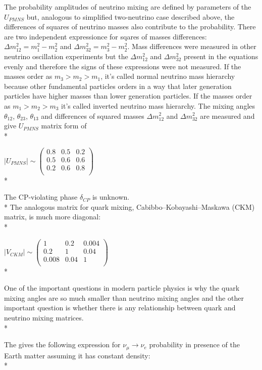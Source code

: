 The probability amplitudes of neutrino mixing are defined by parameters of the $U_{PMNS}$ but, analogous to simplified two-neutrino case described above, the differences of squares of neutrino masses also contribute to the probability. There are two independent expressionce for sqares of masses differences: ${\Delta}m_{12}^2 = m_1^2-m_2^2$ and ${\Delta}m_{32}^2 = m_3^2-m_2^2$. Mass differences were measured in other neutrino oscillation experiments but the ${\Delta}m_{12}^2$ and ${\Delta}m_{32}^2$ present in the equations evenly and therefore the signs of these expressions were not measured. If the masses order as $m_3 > m_2 > m_1$, it's called normal neutrino mass hierarchy because other fundamental particles orders in a way that later generation particles have higher masses than lower generation particles. If the masses order as $m_1 > m_2 > m_3$ it's called inverted neutrino mass hierarchy. The mixing angles $\theta_{12}$, $\theta_{23}$, $\theta_{13}$ and differences of squared masses ${\Delta}m_{12}^2$ and ${\Delta}m_{32}^2$ are measured and give $U_{PMNS}$ matrix form of\\*

$|U_{PMNS}| \sim
 \begin{pmatrix}
  0.8 & 0.5 & 0.2 \\ 0.5 & 0.6 & 0.6 \\ 0.2 & 0.6 & 0.8 \\
 \end{pmatrix}$\\*

The CP-violating phase $\delta_{CP}$ is unknown.\\*
The analogous matrix for quark mixing, Cabibbo–Kobayashi–Maskawa (CKM) matrix, is much more diagonal:\\*

$|V_{CKM}| \sim
 \begin{pmatrix}
  1 & 0.2 & 0.004 \\ 0.2 & 1 & 0.04 \\ 0.008 & 0.04 & 1 \\
 \end{pmatrix}$\\*

One of the important questions in modern particle physics is why the quark mixing angles are so much smaller than neutrino mixing angles and the other important question is whether there is any relationship between quark and neutrino mixing matrices.\\*

The \cite{ref_LBNFdoc_volume-physics} gives the following expression for $\nu_\mu \rightarrow \nu_e$ probability in presence of the Earth matter assuming it has constant density: \\*

